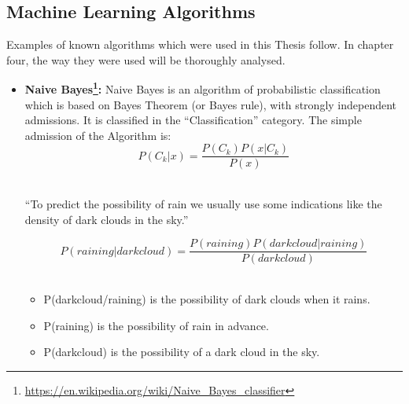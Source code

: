 \subsection{Machine Learning Algorithms}\label{212_ref}
Examples of known algorithms which were used in this Thesis follow. In chapter four, the way they were used will be thoroughly analysed.\\
\begin{itemize}

	\item \textbf{Naive Bayes\footnote{\url{https://en.wikipedia.org/wiki/Naive_Bayes_classifier}}:} Naive Bayes is an algorithm of probabilistic classification which is based on Bayes Theorem (or Bayes rule), with strongly independent admissions. It is classified in the ``Classification'' category. The simple admission of the Algorithm is:\\

\begin{equation}
P\left(C_{k}|x\right)=\frac{P\left(C_{k}\right)P\left(x|C_{k}\right)}{P\left(x\right)}
\end{equation}
\\
\begin{example}
	``To predict the possibility of rain we usually use some indications like the density of dark clouds in the sky.''\\
\end{example}

\begin{equation}
P\left(raining|darkcloud\right)=\frac{P\left(raining\right)P\left(darkcloud|raining\right)}{P\left(darkcloud\right)}
\end{equation}
\\
\begin{itemize}

	\item P(darkcloud/raining) is the possibility of dark clouds when it rains.
	\item P(raining) is the possibility of rain in advance.
	\item P(darkcloud) is the possibility of a dark cloud in the sky.\\

\end{itemize}



\end{itemize}
